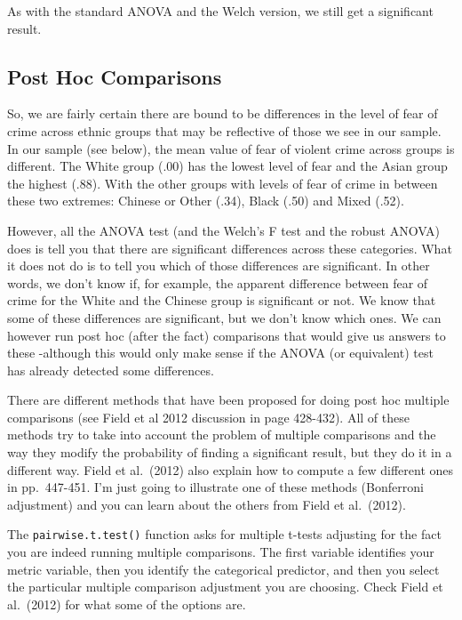 \documentclass[
]{book}
\begin{document}
As with the standard ANOVA and the Welch version, we still get a significant result.

\subsection{Post Hoc Comparisons}\label{post-hoc-comparisons}

So, we are fairly certain there are bound to be differences in the level of fear of crime across ethnic groups that may be reflective of those we see in our sample. In our sample (see below), the mean value of fear of violent crime across groups is different. The White group (.00) has the lowest level of fear and the Asian group the highest (.88). With the other groups with levels of fear of crime in between these two extremes: Chinese or Other (.34), Black (.50) and Mixed (.52).

However, all the ANOVA test (and the Welch's F test and the robust ANOVA) does is tell you that there are significant differences across these categories. What it does not do is to tell you which of those differences are significant. In other words, we don't know if, for example, the apparent difference between fear of crime for the White and the Chinese group is significant or not. We know that some of these differences are significant, but we don't know which ones. We can however run post hoc (after the fact) comparisons that would give us answers to these -although this would only make sense if the ANOVA (or equivalent) test has already detected some differences.

There are different methods that have been proposed for doing post hoc multiple comparisons (see Field et al 2012 discussion in page 428-432). All of these methods try to take into account the problem of multiple comparisons and the way they modify the probability of finding a significant result, but they do it in a different way. Field et al.~(2012) also explain how to compute a few different ones in pp.~447-451. I'm just going to illustrate one of these methods (Bonferroni adjustment) and you can learn about the others from Field et al.~(2012).

The \texttt{pairwise.t.test()} function asks for multiple t-tests adjusting for the fact you are indeed running multiple comparisons. The first variable identifies your metric variable, then you identify the categorical predictor, and then you select the particular multiple comparison adjustment you are choosing. Check Field et al.~(2012) for what some of the options are.
\end{document}
